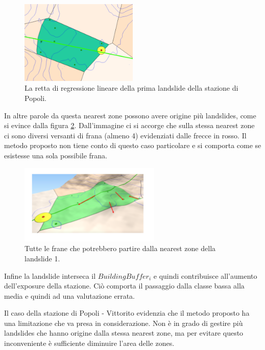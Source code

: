 	\begin{figure}[h]
	\centering
	\includegraphics[width=0.5\textwidth]{images/PopoliRect}
	\caption{La retta di regressione lineare della prima landslide della stazione di Popoli.}
	\label{popolirect}
\end{figure}


In altre parole da questa nearest zone possono avere origine più landslides, come si evince dalla figura \ref{popolimultilandslide}. Dall'immagine ci si accorge che sulla stessa nearest zone ci sono diversi versanti di frana (almeno 4) evidenziati dalle frecce in rosso. Il metodo proposto non tiene conto di questo caso particolare e si comporta come se esistesse una sola possibile frana. 

\begin{figure}[h]
	\centering
	\includegraphics[width=0.6\textwidth]{images/PopoliMultiLandslide}
	\caption{Tutte le frane che potrebbero partire dalla nearest zone della landslide 1.}
	\label{popolimultilandslide}
\end{figure}

Infine la landslide interseca il $BuildingBuffer_i$ e quindi contribuisce all'aumento dell'exposure della stazione. Ciò comporta il passaggio dalla classe bassa alla media e quindi ad una valutazione errata.

Il caso della stazione di Popoli - Vittorito evidenzia che il metodo proposto ha una limitazione che va presa in considerazione. Non è in grado di gestire più landslides che hanno origine dalla stessa nearest zone, ma per evitare questo inconveniente è sufficiente diminuire l'area delle zones.

